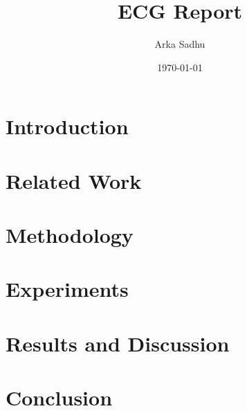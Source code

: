 \documentclass{article}
\title{ECG Report}
\author{
  Arka Sadhu}
\date{\today}
\begin{document}
\maketitle

\tableofcontents
\newpage
\section{Introduction}
\section{Related Work}
\section{Methodology}
\section{Experiments}
\section{Results and Discussion}
\section{Conclusion}




\end{document}
